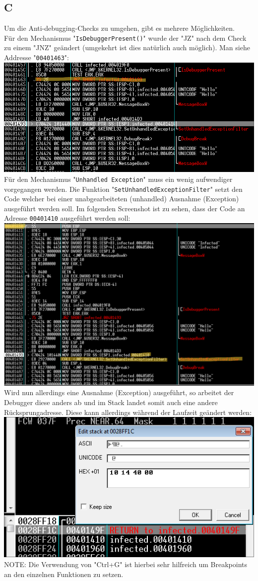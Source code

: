 \documentclass{article}
\begin{document}
	\subsection*{C}
	Um die Anti-debugging-Checks zu umgehen, gibt es mehrere Möglichkeiten.\\
	Für den Mechanismus "\texttt{IsDebuggerPresent()}" wurde der "JZ" nach dem Check zu einem "JNZ" geändert (umgekehrt ist dies natürlich auch möglich). Man siehe Addresse "\texttt{00401463}":\\
	\includegraphics[width=0.7\linewidth]{"pictures/c - rev - isdebugged.png"}\\
	Für den Mechanismus "\texttt{Unhandled Exception}" muss ein wenig aufwendiger vorgegangen werden. Die Funktion "\texttt{SetUnhandledExceptionFilter}" setzt den Code welcher bei einer unabgearbeiteten (unhandled) Ausnahme (Exception) ausgeführt werden soll. Im folgenden Screenshot ist zu sehen, dass der Code an Adresse \texttt{00401410} ausgeführt werden soll:\\
	\includegraphics[width=0.7\linewidth]{"pictures/c - rev - unhandled exception.png"}\\
	Wird nun allerdings eine Ausnahme (Exception) ausgeführt, so arbeitet der Debugger diese anders ab und im Stack landet somit auch eine andere Rücksprungadresse. Diese kann allerdings während der Laufzeit geändert werden:\\
	\includegraphics[width=0.7\linewidth]{"pictures/c - rev - unhandled exception - stack.png"}\\
	NOTE: Die Verwendung von "Ctrl+G" ist hierbei sehr hilfreich um Breakpoints an den einzelnen Funktionen zu setzen.\\
	
\end{document}
